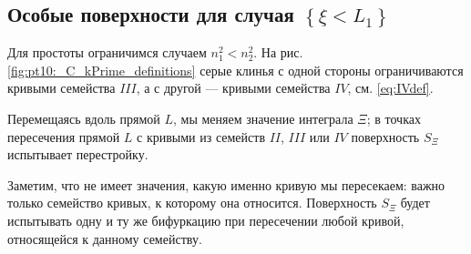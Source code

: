 \subsection{Особые поверхности для случая $\left\{ \xi < L_1 \right\}$}\label{s3.10}
Для простоты ограничимся случаем  $n_1^2 < n_2^2$. 
На рис. \ref{fig:pt10:_C_kPrime_definitions} серые клинья с одной стороны ограничиваются кривыми семейства $III$, а с другой --- кривыми семейства $IV$, см. \eqref{eq:IVdef}.

Перемещаясь вдоль прямой $L$, мы меняем значение интеграла $\Xi$; в точках пересечения прямой $L$ с кривыми  из семейств $II$, $III$ или $IV$ поверхность $S_\Xi$ испытывает перестройку.

Заметим, что не имеет значения, какую  именно кривую мы пересекаем: важно только семейство кривых, к которому она относится. Поверхность $S_\Xi$ будет испытывать одну и ту же бифуркацию при пересечении любой кривой, относящейся к данному семейству.
 
